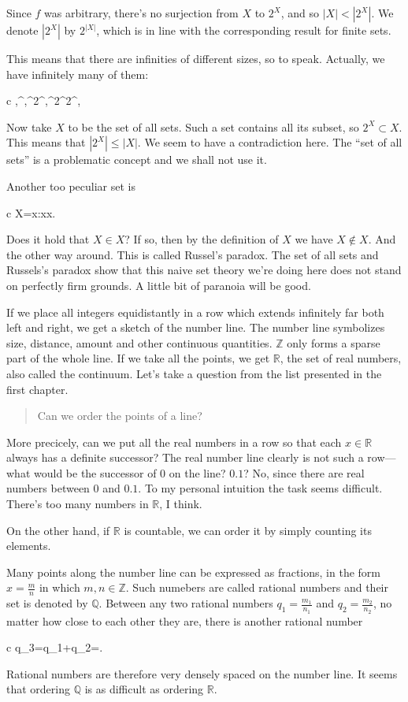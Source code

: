 \documentclass[11pt,%
]{memoir}
\newenvironment{eqna}{\begin{IEEEeqnarray}{c}}{\end{IEEEeqnarray}\ignorespacesafterend}
\newcommand{\NN}{\mathbb{N}}
\newcommand{\RR}{\mathbb{R}}
\newcommand{\ZZ}{\mathbb{Z}}
\newcommand{\QQ}{\mathbb{Q}}
\begin{document}
Since \(f\) was arbitrary, there's no surjection from \(X\) to \(2^X\), and so \(|X|<|2^X|\). We denote \(|2^X|\) by \(2^{|X|}\), which is in line with the corresponding result for finite sets.

This means that there are infinities of different sizes, so to speak. Actually, we have infinitely many of them:
\begin{eqna}
    \NN,^\NN,^{2^\NN},^{2^{2^\NN}},\: \dotsc
\end{eqna}

Now take \(X\) to be the set of all sets. Such a set contains all its subset, so \(2^X\subset X\). This means that \(|2^X|\leq|X|\). We seem to have a contradiction here. The ``set of all sets'' is a problematic concept and we shall not use it.

Another too peculiar set is
\begin{eqna}
    X=\lbrace x:x\notin x\rbrace.
\end{eqna}
Does it hold that \(X\in X\)? If so, then by the definition of \(X\) we have \(X\notin X\). And the other way around. This is called Russel's paradox. The set of all sets and Russels's paradox show that this naive set theory we're doing here does not stand on perfectly firm grounds. A little bit of paranoia will be good.

If we place all integers equidistantly in a row which extends infinitely far both left and right, we get a sketch of the number line. The number line symbolizes size, distance, amount and other continuous quantities. \(\ZZ\) only forms a sparse part of the whole line. If we take all the points, we get \(\RR\), the set of real numbers, also called the continuum. Let's take a question from the list presented in the first chapter.
\begin{quote}
    Can we order the points of a line?
\end{quote}
More precicely, can we put all the real numbers in a row so that each \(x\in\RR\) always has a definite successor? The real number line clearly is not such a row---what would be the successor of \(0\) on the line? \(0.1\)? No, since there are real numbers between \(0\) and \(0.1\). To my personal intuition the task seems difficult. There's too many numbers in \(\RR\), I think.

On the other hand, if \(\RR\) is countable, we can order it by simply counting its elements.

Many points along the number line can be expressed as fractions, in the form \(x=\frac{m}{n}\) in which \(m,n\in\ZZ\). Such numebers are called rational numbers and their set is denoted by \(\QQ\). Between any two rational numbers \(q_1=\frac{m_1}{n_1}\) and \(q_2=\frac{m_2}{n_2}\), no matter how close to each other they are, there is another rational number
\begin{eqna}
    q_3=q_1+q_2=.
\end{eqna}
Rational numbers are therefore very densely spaced on the number line. It seems that ordering \(\QQ\) is as difficult as ordering \(\RR\).
\end{document}
